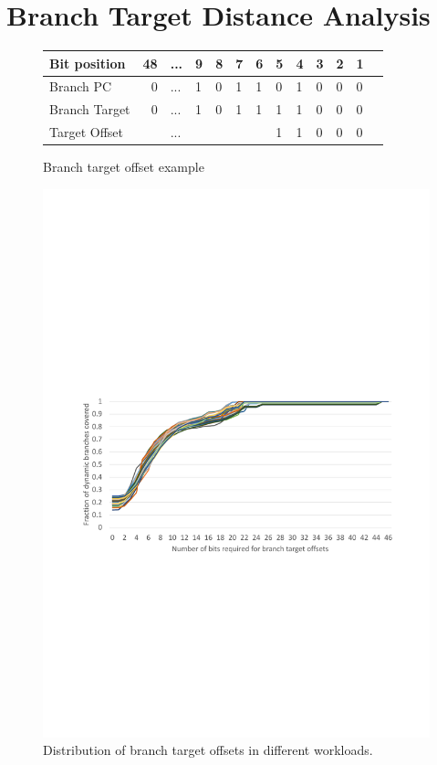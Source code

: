 \section{Branch Target Distance Analysis}
\label{hpca:sec:analysis}

\begin{figure}
  \sffamily
  \centering
  \begin{tabular}{p{2.2cm}|rlllllllllll}
    Bit position      & 48 & ... & 9 & 8 & 7 & 6 & 5 & 4 & 3 & 2 & 1\\\hline
    Branch PC         &  0 & ... & 1 & 0 & 1 & 1 & 0 & 1 & 0 & 0 & 0\\
    Branch Target     &  0 & ... & 1 & 0 & 1 & 1 & 1 & 1 & 0 & 0 & 0\\
    Target Offset     &    & ... &   &   &   &   & 1 & 1 & 0 & 0 & 0\\
  \end{tabular}
  \caption{\label{hpca:fig:concat} Branch target offset example}
\end{figure}

\begin{figure}
    \centering
    \includegraphics[width=\textwidth, trim=60 280 50 320, clip]{figures/offset_distribution.pdf}
    \caption{Distribution of branch target offsets in different workloads.}
    \label{hpca:fig:offsets}
\end{figure}


